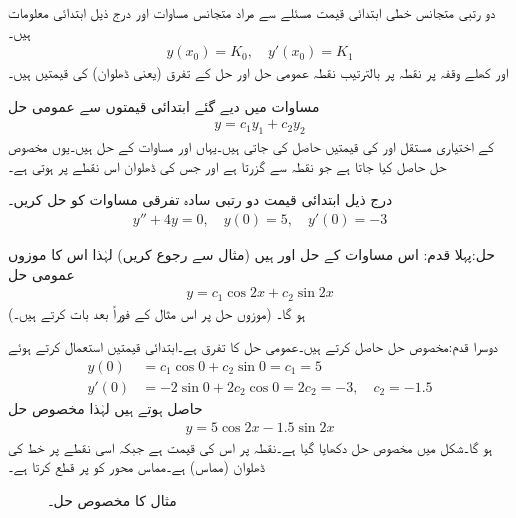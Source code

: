 دو رتبی متجانس خطی ابتدائی قیمت مسئلے سے مراد متجانس مساوات  اور درج ذیل ابتدائی معلومات ہیں۔
\begin{align}\label{مساوات_سادہ_دو_درجی_ابتدائی_قیمتیں}
y(x_0)=K_0,\quad y'(x_0)=K_1
\end{align}
 اور   کھلے وقفہ پر نقطہ  پر بالترتیب نقطہ عمومی حل اور حل کے تفرق (یعنی ڈھلوان) کی قیمتیں ہیں۔ 

مساوات  میں دیے گئے ابتدائی قیمتوں سے عمومی حل
\begin{align}
y=c_1y_1+c_2y_2
\end{align}
کے اختیاری مستقل  اور  کی قیمتیں حاصل کی جاتی ہیں۔یہاں  اور  مساوات  کے حل ہیں۔یوں مخصوص حل حاصل کیا جاتا ہے جو نقطہ  سے گزرتا ہے اور جس کی ڈھلوان اس نقطے پر  ہوتی ہے۔

درج ذیل ابتدائی قیمت دو رتبی سادہ تفرقی مساوات کو حل کریں۔
\begin{align*}
y''+4y=0,\quad y(0)=5,\quad y'(0)=-3
\end{align*}

حل:پہلا قدم: \quad اس مساوات کے حل   اور  ہیں (مثال  سے رجوع کریں) لہٰذا اس کا موزوں عمومی حل
\begin{align}\label{مساوات_سادہ_دو_درجی_عمومی_حل_الف}
y=c_1\cos 2x+c_2\sin 2x
\end{align}
ہو گا۔ (موزوں حل پر اس مثال کے فوراً بعد بات کرتے ہیں۔)

دوسرا قدم:مخصوص حل حاصل کرتے ہیں۔عمومی حل کا تفرق  ہے۔ابتدائی قیمتیں استعمال کرتے ہوئے
\begin{align*}
y(0)&=c_1 \cos 0+c_2\sin 0=c_1=5\\
y'(0)&=-2\sin 0+2c_2\cos 0=2c_2=-3, \quad c_2=-1.5
\end{align*}
حاصل ہوتے ہیں لہٰذا مخصوص حل
\begin{align*}
y=5\cos 2x-1.5\sin 2x
\end{align*}
ہو گا۔شکل  میں مخصوص حل دکھایا گیا ہے۔نقطہ  پر اس کی قیمت  ہے جبکہ اسی نقطے پر خط کی ڈھلوان (مماس)  ہے۔مماس  محور کو  پر قطع کرتا ہے۔
\begin{figure}
\centering
{}
\caption{مثال  کا مخصوص حل۔}
\label{شکل_مثال_سادہ_دو_درجی_ابتدائی_قیمت_الف}
\end{figure}

